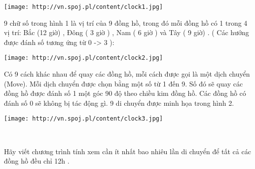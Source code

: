 \texttt{[image: http://vn.spoj.pl/content/clock1.jpg]}

9 chữ số trong hình 1 là vị trí của 9 đồng hồ, trong đó mỗi đồng hồ có 1 trong 4 vị trí: Bắc (12 giờ) , Đông ( 3 giờ ) , Nam ( 6 giờ ) và Tây ( 9 giờ) . ( Các hướng được đánh số tương ứng từ 0 -> 3 ):



\texttt{[image: http://vn.spoj.pl/content/clock2.jpg]}


Có 9 cách khác nhau để quay các đồng hồ, mỗi cách được gọi là một dịch chuyển (Move). Mỗi dịch chuyển được chọn bằng một số từ 1 đến 9. Số đó sẽ quay các đồng hồ được đánh số 1 một góc 90 độ theo chiều kim đồng hồ. Các đồng hồ có đánh số 0 sẽ không bị tác động gì. 9 di chuyển được minh họa trong hình 2.


\texttt{[image: http://vn.spoj.pl/content/clock3.jpg]}

 

Hãy viết chương trình tính xem cần ít nhất bao nhiêu lần di chuyển để tất cả các đồng hồ đều chỉ 12h .